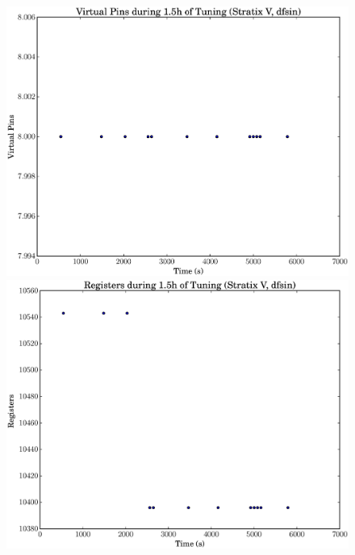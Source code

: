 \documentclass[12pt, a4paper]{article}
\begin{document}
\begin{figure}[htpb]
    \begin{minipage}{.48\textwidth}
        \includegraphics[scale=.25]{dfsin_pins_5400_chstone_StratixV}
    \end{minipage}%
    \hfill
    \begin{minipage}{.48\textwidth}
        \includegraphics[scale=.25]{dfsin_regs_5400_chstone_StratixV}
    \end{minipage}%


\end{figure}
\end{document}
